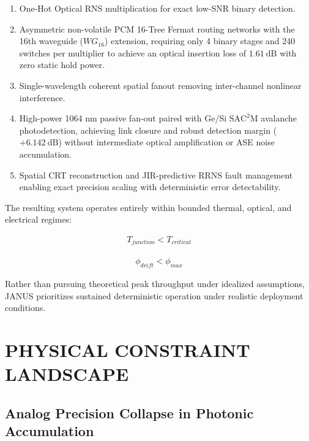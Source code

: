 \documentclass[journal]{IEEEtran}
\begin{document}
\begin{enumerate}
\item One-Hot Optical RNS multiplication for exact low-SNR binary detection.
\item Asymmetric non-volatile PCM 16-Tree Fermat routing networks with the 16th waveguide ($WG_{16}$) extension, requiring only 4 binary stages and 240 switches per multiplier to achieve an optical insertion loss of $1.61~\mathrm{dB}$ with zero static hold power.
\item Single-wavelength coherent spatial fanout removing inter-channel nonlinear interference.
\item High-power 1064 nm passive fan-out paired with Ge/Si $\mathrm{SAC^2M}$ avalanche photodetection, achieving link closure and robust detection margin ($+6.142~\mathrm{dB}$) without intermediate optical amplification or ASE noise accumulation.
\item Spatial CRT reconstruction and JIR-predictive RRNS fault management enabling exact precision scaling with deterministic error detectability.
\end{enumerate}

The resulting system operates entirely within bounded thermal, optical, and electrical regimes:

\begin{center}
\end{center}

\begin{align}
\text{$T_{junction} < T_{critical}$}
\end{align}

\begin{align}
\text{$\phi_{drift} < \phi_{max}$}
\end{align}

Rather than pursuing theoretical peak throughput under idealized assumptions, JANUS prioritizes sustained deterministic operation under realistic deployment conditions.

\section{PHYSICAL CONSTRAINT LANDSCAPE}

\subsection{\textbf{Analog Precision Collapse in Photonic Accumulation}}
\end{document}

